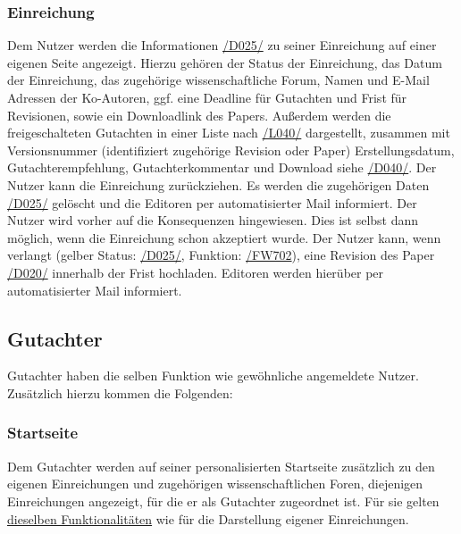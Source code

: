 \subsubsection{Einreichung}\label{nut:ein}
\begin{description}
     Dem Nutzer werden die Informationen \hyperref[d025]{/D025/} zu seiner Einreichung auf einer eigenen Seite
    angezeigt. Hierzu gehören der Status der Einreichung, das Datum der Einreichung, das zugehörige
    wissenschaftliche Forum, Namen und E-Mail Adressen der Ko-Autoren, ggf. eine Deadline für Gutachten und Frist für Revisionen,
    sowie ein Downloadlink des Papers.
     Außerdem werden die freigeschalteten Gutachten in einer
    Liste nach \hyperref[leist:40]{/L040/} dargestellt, zusammen mit Versionsnummer (identifiziert zugehörige Revision oder Paper)
    Erstellungsdatum, Gutachterempfehlung, Gutachterkommentar und Download siehe \hyperref[d040]{/D040/}.
     Der Nutzer kann die Einreichung zurückziehen. Es werden die zugehörigen Daten
    \hyperref[d025]{/D025/} gelöscht und die Editoren per automatisierter Mail informiert.
    Der Nutzer wird vorher auf die Konsequenzen hingewiesen. Dies ist selbst dann möglich, wenn die Einreichung schon akzeptiert wurde.
     Der Nutzer kann, wenn verlangt (gelber Status: \hyperref[d025]{/D025/}, Funktion: \hyperref[funkt:702]{/FW702}),
    eine Revision des Paper \hyperref[d020]{/D020/} innerhalb der Frist hochladen.
    Editoren werden hierüber per automatisierter Mail informiert.
\end{description}

\subsection{Gutachter}\label{funkt:Gutachter}
Gutachter haben die selben Funktion wie gewöhnliche angemeldete Nutzer. Zusätzlich hierzu kommen die Folgenden:

\subsubsection{Startseite}
\begin{description}
     Dem Gutachter werden auf seiner personalisierten Startseite zusätzlich zu den eigenen
    Einreichungen und zugehörigen wissenschaftlichen Foren, diejenigen Einreichungen angezeigt, für die er als Gutachter
    zugeordnet ist.
    Für sie gelten \hyperref[nut:start]{dieselben Funktionalitäten} wie für die Darstellung eigener Einreichungen.
\end{description}

